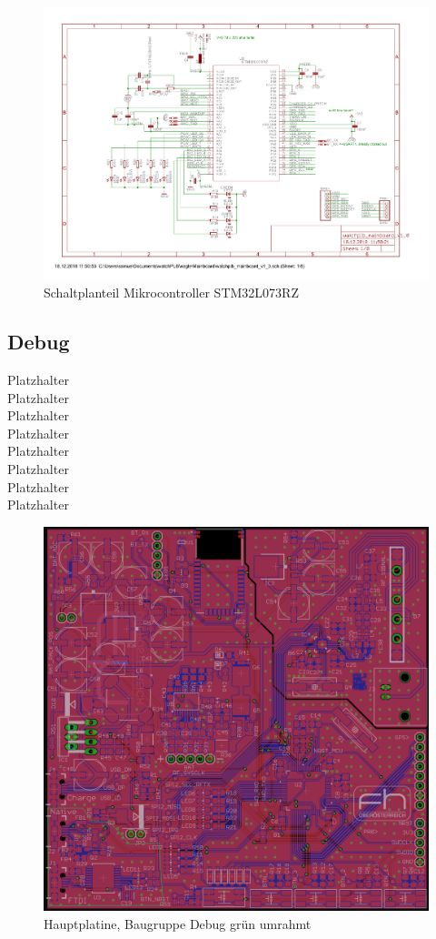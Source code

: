 \documentclass[a4paper]{scrartcl}
\begin{document}
\begin{figure}[H]\centering
\includegraphics[page=1, angle=90, width=\linewidth]{../eagle/Mainboard/watchplb_mainboard_v1_0.pdf}
\caption{Schaltplanteil Mikrocontroller STM32L073RZ}
\label{fig:abb1}
\end{figure}

\subsection{Debug}

Platzhalter\\Platzhalter\\Platzhalter\\Platzhalter\\Platzhalter\\Platzhalter\\
Platzhalter\\Platzhalter

\begin{figure}[H]\centering
\includegraphics[page=1, angle=0, width=\linewidth]{../Documentation/pics/mainboard_debug.png}
\caption{Hauptplatine, Baugruppe Debug grün umrahmt}
\label{fig:abb1}
\end{figure}
\end{document}
